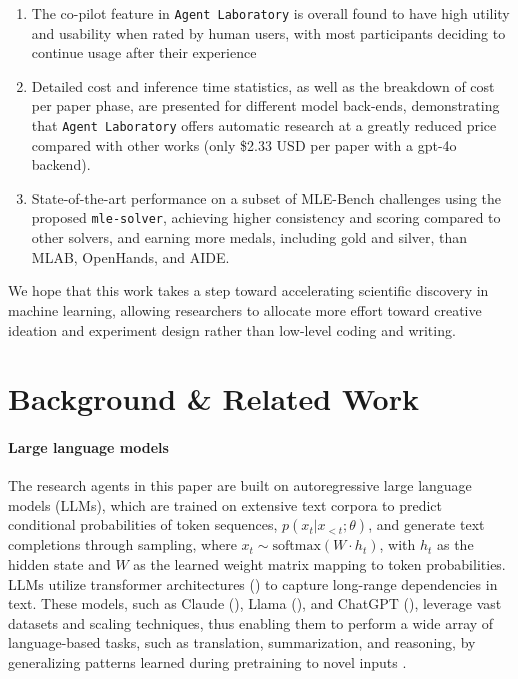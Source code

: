 \documentclass[11pt, a4paper]{gdm_format}
\begin{document}
\begin{enumerate}
    \item The co-pilot feature in \texttt{Agent Laboratory} is overall found to have high utility and usability when rated by human users, with most participants deciding to continue usage after their experience
    \item Detailed cost and inference time statistics, as well as the breakdown of cost per paper phase, are presented for different model back-ends, demonstrating that \texttt{Agent Laboratory} offers automatic research at a greatly reduced price compared with other works (only \$2.33 USD per paper with a gpt-4o backend).
    \item State-of-the-art performance on a subset of MLE-Bench challenges using the proposed \texttt{mle-solver}, achieving higher consistency and scoring compared to other solvers, and earning more medals, including gold and silver, than MLAB, OpenHands, and AIDE.
\end{enumerate}

We hope that this work takes a step toward accelerating scientific discovery in machine learning, allowing researchers to allocate more effort toward creative ideation and experiment design rather than low-level coding and writing.



\section{Background \& Related Work}

\paragraph{Large language models} 

The research agents in this paper are built on autoregressive large language models (LLMs), which are trained on extensive text corpora to predict conditional probabilities of token sequences, \(p(x_t | x_{<t}; \theta)\), and generate text completions through sampling, where \(x_t \sim \text{softmax}(W \cdot h_t)\), with \(h_t\) as the hidden state and \(W\) as the learned weight matrix mapping to token probabilities. LLMs utilize transformer architectures (\cite{vaswani2017attention}) to capture long-range dependencies in text. These models, such as Claude (\cite{anthropic2024claude}), Llama (\cite{touvron2023llama1,touvron2023llama,dubey2024llama}), and ChatGPT (\cite{hurst2024gpt, openai_gpt3.5, achiam2023gpt}), leverage vast datasets and scaling techniques, thus enabling them to perform a wide array of language-based tasks, such as translation, summarization, and reasoning, by generalizing patterns learned during pretraining to novel inputs \cite{brown2020language}. 
\end{document}
